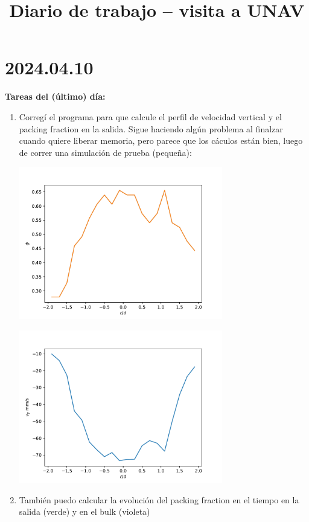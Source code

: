 \documentclass[11pt]{article}
\begin{document}
\title{Diario de trabajo -- visita a UNAV}

\section*{2024.04.10}
\textbf{Tareas del (último) día:}
\begin{enumerate}
    \item Corregí el programa para que calcule el perfil de velocidad vertical y el 
        packing fraction en la salida. Sigue haciendo algún problema al finalzar
        cuando quiere liberar memoria, pero parece que los cáculos están bien, luego
        de correr una simulación de prueba (pequeña):
\begin{center}
  \includegraphics[width=0.7\textwidth]{figs/perfil-pf.pdf}
\end{center}
\begin{center}
  \includegraphics[width=0.7\textwidth]{figs/perfil-vy.pdf}
\end{center}
\item También puedo calcular la evolución del packing fraction en el tiempo en la salida (verde)
    y en el bulk (violeta)
\begin{center}

\end{center}
\end{enumerate}
\end{document}
